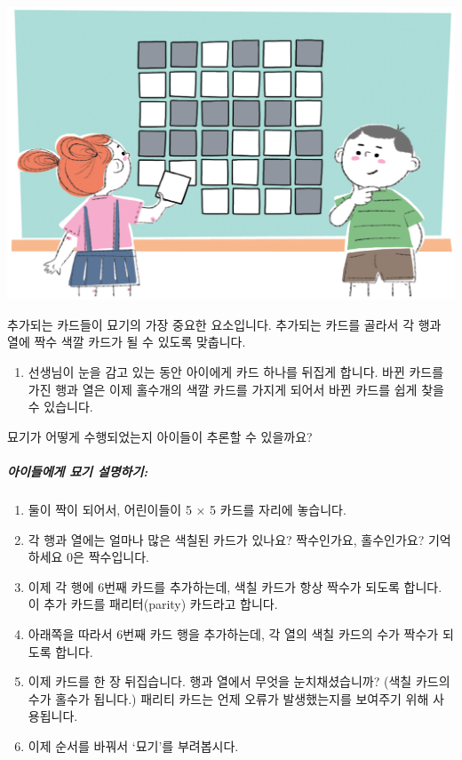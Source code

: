 \documentclass[]{article}
\begin{document}
\includegraphics{csunplugged/01-part/img/ch04-checksum/04-checksum-01-magician-02.png}

추가되는 카드들이 묘기의 가장 중요한 요소입니다. 추가되는 카드를 골라서
각 행과 열에 짝수 색깔 카드가 될 수 있도록 맞춥니다.

\begin{enumerate}
\itemsep1pt\parskip0pt
\item
  선생님이 눈을 감고 있는 동안 아이에게 카드 하나를 뒤집게 합니다. 바뀐
  카드를 가진 행과 열은 이제 홀수개의 색깔 카드를 가지게 되어서 바뀐
  카드를 쉽게 찾을 수 있습니다.
\end{enumerate}

묘기가 어떻게 수행되었는지 아이들이 추론할 수 있을까요?

\subparagraph{아이들에게 묘기 설명하기:}\label{section-68}

\begin{enumerate}
\itemsep1pt\parskip0pt
\item
  둘이 짝이 되어서, 어린이들이 5 × 5 카드를 자리에 놓습니다.
\item
  각 행과 열에는 얼마나 많은 색칠된 카드가 있나요? 짝수인가요,
  홀수인가요? 기억하세요 0은 짝수입니다.
\item
  이제 각 행에 6번째 카드를 추가하는데, 색칠 카드가 항상 짝수가 되도록
  합니다. 이 추가 카드를 패리터(parity) 카드라고 합니다.
\item
  아래쪽을 따라서 6번째 카드 행을 추가하는데, 각 열의 색칠 카드의 수가
  짝수가 되도록 합니다.
\item
  이제 카드를 한 장 뒤집습니다. 행과 열에서 무엇을 눈치채셨습니까? (색칠
  카드의 수가 홀수가 됩니다.) 패리티 카드는 언제 오류가 발생했는지를
  보여주기 위해 사용됩니다.
\item
  이제 순서를 바꿔서 `묘기'를 부려봅시다.
\end{enumerate}
\end{document}
